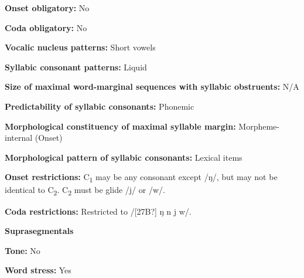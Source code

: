 \begin{styleBody}
\textbf{Onset obligatory:} No
\end{styleBody}

\begin{styleBody}
\textbf{Coda obligatory:} No
\end{styleBody}

\begin{styleBody}
\textbf{Vocalic nucleus patterns:} Short vowels
\end{styleBody}

\begin{styleBody}
\textbf{Syllabic consonant patterns:} Liquid
\end{styleBody}

\begin{styleBody}
\textbf{Size of maximal word{}-marginal sequences with syllabic obstruents:} N/A
\end{styleBody}

\begin{styleBody}
\textbf{Predictability of syllabic consonants:} Phonemic
\end{styleBody}

\begin{styleBody}
\textbf{Morphological constituency of maximal syllable margin:} Morpheme-internal (Onset)
\end{styleBody}

\begin{styleBody}
\textbf{Morphological pattern of syllabic consonants:} Lexical items
\end{styleBody}

\begin{styleBody}
\textbf{Onset restrictions: }C\textsubscript{1} may be any consonant except /ŋ/, but may not be identical to C\textsubscript{2}. C\textsubscript{2} must be glide /j/ or /w/. 
\end{styleBody}

\begin{styleBody}
\textbf{Coda restrictions: }Restricted to /[27B?] ŋ n j w/.
\end{styleBody}

\begin{styleBody}
\textbf{Suprasegmentals}
\end{styleBody}

\begin{styleBody}
\textbf{Tone:} No
\end{styleBody}

\begin{styleBody}
\textbf{Word stress:} Yes
\end{styleBody}

